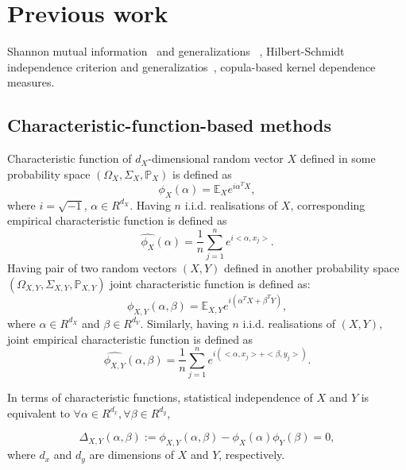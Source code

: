 \documentclass{article}
\begin{document}
\section{Previous work}
\label{section:previous_work}
Shannon mutual information~\cite{Cover2006} and generalizations ~\cite{e20110813},  Hilbert-Schmidt independence criterion \cite{Gretton2005MeasuringSD} and generalizatios~\cite{?}, \cite{Pczos2012CopulabasedKD} copula-based kernel dependence measures.

\subsection{Characteristic-function-based methods}
\label{section:previous_work_cf}
Characteristic function of $d_{X}$-dimensional random vector $X$ defined in some probability space $(\Omega_{X}, \Sigma_{X}, \mathbb{P}_{X})$ is defined as 
\begin{equation}
    \label{eq:characteristic_function}
    \phi_{X}(\alpha) = \mathbb{E}_{X} e^{i\alpha^{T}X}, 
\end{equation}
where $i=\sqrt{-1}$, $\alpha \in R^{d_{X}}$. Having $n$ i.i.d. realisations of $X$, corresponding empirical characteristic function is defined as
\begin{equation}
    \label{eq:ecf}
  \widehat{\phi_{X}}(\alpha) = \frac{1}{n} \sum_{j=1}^{n} e^{i <\alpha, x_{j}>}.
\end{equation}
Having pair of two random vectors $(X,Y)$ defined in another probability space $(\Omega_{X,Y}, \Sigma_{X,Y}, \mathbb{P}_{X,Y})$  joint characteristic function is defined as:
\begin{equation}
    \label{eq:joint_characteristic_function}
    \phi_{X,Y}(\alpha,\beta) = \mathbb{E}_{X,Y} e^{i(\alpha^{T}X + \beta^{T}Y)},
\end{equation}
where $\alpha \in R^{d_{X}}$ and $\beta \in R^{d_{Y}}$. Similarly, having 
$n$ i.i.d. realisations of $(X,Y)$, joint empirical characteristic function is defined as
\begin{equation}
    \label{eq:joint_ecf}
\widehat{\phi_{X,Y}}(\alpha,\beta) = \frac{1}{n} \sum_{j=1}^{n} e^{i(<\alpha, x_{j}> + <\beta, y_{j}>) }.
\end{equation}

In terms of characteristic functions, statistical independence  of $X$ and $Y$ is equivalent to $\forall \alpha \in R^{d_x},\forall \beta \in R^{d_y} $, 

\begin{equation}
\label{eq:kac_theorem}
\Delta_{X,Y}(\alpha, \beta) := \phi_{X,Y}(\alpha,\beta) - \phi_{X}(\alpha) \phi_{Y}(\beta) = 0,
\end{equation}
where $d_{x}$ and $d_{y}$ are dimensions of $X$ and $Y$, respectively.
\end{document}
